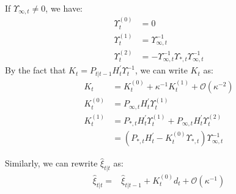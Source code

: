 \documentclass[10pt, titlepage]{article}
\numberwithin{equation}{section}
\begin{document}
If $\Upsilon_{\infty,t}\neq 0$, we have:
\begin{align*}
    \Upsilon_t^{(0)} &= 0 \\
    \Upsilon_t^{(1)} &= \Upsilon_{\infty,t}^{-1} \\
    \Upsilon_t^{(2)} &= -\Upsilon_{\infty,t}^{-1}\Upsilon_{*,t}\Upsilon_{\infty,t}^{-1}
\end{align*}
By the fact that $K_t = P_{t|t-1}H_t^{'}\Upsilon_t^{-1}$, we can write $K_t$ as:
\begin{align}
    K_t &= K_t^{(0)} + \kappa^{-1}K_t^{(1)} + \mathcal{O}(\kappa^{-2}) \label{eq:K1_diffuse_start} \\
    K_t^{(0)} &= P_{\infty,t}H_t^{'}\Upsilon_t^{(1)} \\
    K_t^{(1)} &= P_{*,t}H_t^{'}\Upsilon_t^{(1)} + P_{\infty,t}H_t^{'}\Upsilon_t^{(2)} \nonumber \\
    &= (P_{*,t}H_t^{'}-K_t^{(0)}\Upsilon_{*,t})\Upsilon_{\infty,t}^{-1} \label{eq:K1_diffuse_end}
\end{align}

Similarly, we can rewrite $\hat{\xi}_{t|t}$ as:
\begin{align}
    \hat{\xi}_{t|t} =& \hat{\xi}_{t|t-1} + K_t^{(0)}d_t + \mathcal{O}(\kappa^{-1}) \label{eq:diff_xi1} 
\end{align}
\end{document}

